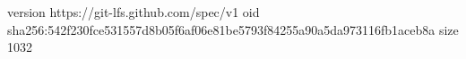 version https://git-lfs.github.com/spec/v1
oid sha256:542f230fce531557d8b05f6af06e81be5793f84255a90a5da973116fb1aceb8a
size 1032
